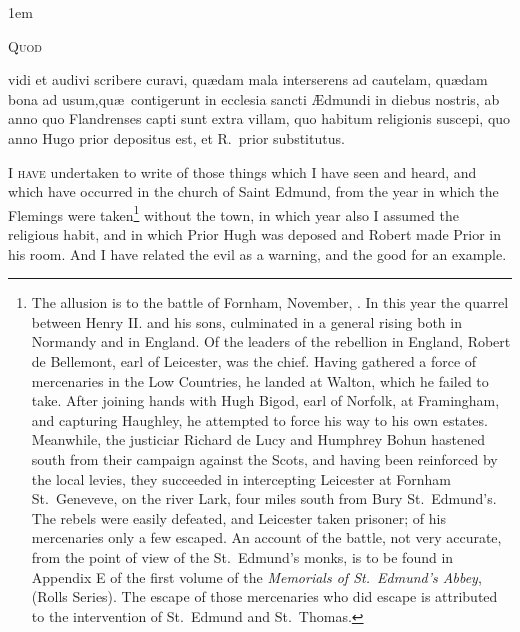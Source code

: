 \documentclass[10pt]{book}
\begin{document}
\cleardoublepage
{}
\emergencystretch 1em


\begin{paracol}{2}

\lettrine[lines=4]{\color{BrickRed}Q}{uod} \begin{otherlanguage}{latin}vidi et audivi scribere curavi, qu\ae{}dam mala interserens ad cautelam, qu\ae{}dam bona ad usum,\linebreak qu\ae{}~\hspace{1.6cm}contigerunt in ecclesia sancti \AE{}dmundi in diebus nostris, ab anno quo Flandrenses capti sunt extra villam, quo habitum religionis suscepi, quo anno Hugo prior depositus est, et R.\ prior substitutus.
\end{otherlanguage}

\switchcolumn

\lettrine[lines=4]{\color{BrickRed}I}{ have} undertaken to write of those things which I have seen and heard, and which have occurred in the church of Saint Edmund, from the year in which the Flemings were taken\footnote{The allusion is to the battle of Fornham, November, . In this year the quarrel between Henry II. and his sons, culminated in a general rising both in Normandy and in England. Of the leaders of the rebellion in England, Robert de Bellemont, earl of Leicester, was the chief. Having gathered a force of mercenaries in the Low Countries, he landed at Walton, which he failed to take. After joining hands with Hugh Bigod, earl of Norfolk, at Framingham, and capturing Haughley, he attempted to force his way to his own estates. Meanwhile, the justiciar Richard de Lucy and Humphrey Bohun hastened south from their campaign against the Scots, and having been reinforced by the local levies, they succeeded in intercepting Leicester at Fornham St.\ Geneveve, on the river Lark, four miles south from Bury St.\ Edmund's. The rebels were easily defeated, and Leicester taken prisoner; of his mercenaries only a few escaped. An account of the battle, not very accurate, from the point of view of the St.\ Edmund's monks, is to be found in Appendix E of the first volume of the \emph{Memorials of St.\ Edmund's Abbey}, (Rolls Series). The escape of those mercenaries who did escape is attributed to the intervention of St.\ Edmund and St.\ Thomas.} without the town, in which year also I assumed the religious habit, and in which Prior Hugh was deposed and Robert made Prior in his room. And I have related the evil as a warning, and the good for an example.


\end{paracol}
\end{document}
